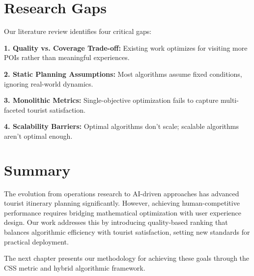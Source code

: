 \section{Research Gaps}

Our literature review identifies four critical gaps:

\textbf{1. Quality vs. Coverage Trade-off:} Existing work optimizes for visiting more POIs rather than meaningful experiences.

\textbf{2. Static Planning Assumptions:} Most algorithms assume fixed conditions, ignoring real-world dynamics.

\textbf{3. Monolithic Metrics:} Single-objective optimization fails to capture multi-faceted tourist satisfaction.

\textbf{4. Scalability Barriers:} Optimal algorithms don't scale; scalable algorithms aren't optimal enough.

\section{Summary}

The evolution from operations research to AI-driven approaches has advanced tourist itinerary planning significantly. However, achieving human-competitive performance requires bridging mathematical optimization with user experience design. Our work addresses this by introducing quality-based ranking that balances algorithmic efficiency with tourist satisfaction, setting new standards for practical deployment.

The next chapter presents our methodology for achieving these goals through the CSS metric and hybrid algorithmic framework.
